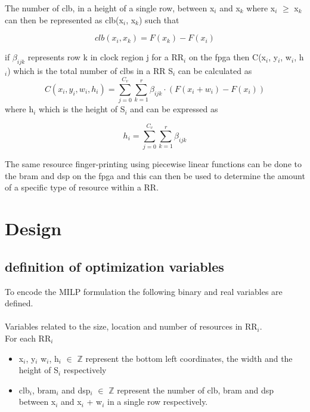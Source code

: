 \documentclass[conference]{IEEEtran}
\begin{document}
The number of clb, in a height of a single row, between x$_i$ and x$_k$ where x$_i$ $\geq$ x$_k$ can then be represented as clb(x$_i$, x$_k$) such that 

\begin{equation}
clb(x_i, x_k) = F(x_k) - F(x_i)
\end{equation}

if $\beta_{ijk}$ represents row k in clock region j for a RR$_i$ on the fpga then C(x$_i$, y$_i$, w$_i$, h$_i$) which is the total number of clbs in a RR S$_i$ can be calculated as 
\begin{equation}
C(x_i,y_i,w_i,h_i) = \sum_{j=0}^{C_v} \sum_{k=1}^{r} \beta_{ijk} \cdot (F(x_i+w_i) - F(x_i))
\label{clb_tot}
\end{equation}
where h$_i$ which is the height of S$_i$ and can be expressed as 

\begin{equation}
h_i = \sum_{j=0} ^{C_v} \sum_{k=1}^{r} \beta_{ijk}
\end{equation}

The same resource finger-printing using piecewise linear functions can be done to the bram and dsp on the fpga and this can then be used to determine the amount of a specific type of resource within a RR.


\section{Design}
\subsection{definition of optimization variables}
To encode the MILP formulation the following binary and real variables are defined. \\ \\
Variables related to the size, location and number of resources in RR$_i$. \\
For each RR$_i$
\begin{itemize}
\item x$_i$, y$_i$ w$_i$, h$_i$ $\in$ $\mathbb{Z}$ represent the bottom left coordinates, the width and the height of S$_i$  respectively
\end{itemize}

\begin{itemize}
\item clb$_i$, bram$_i$ and dsp$_i$  $\in$ $\mathbb{Z}$ represent the number of clb, bram and dsp between x$_i$ and x$_i$ + w$_i$ in a single row respectively.
\end{itemize}
\end{document}
